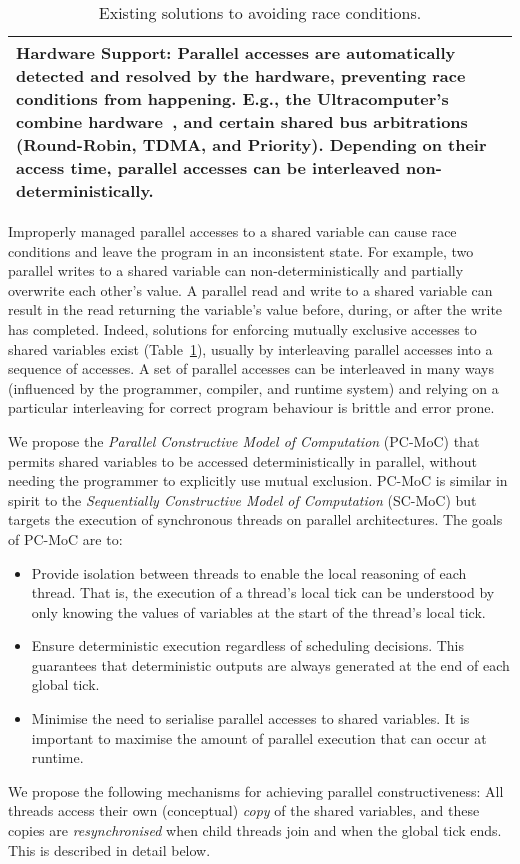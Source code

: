 \begin{table}[t]
\begin{tabular}{| p{\textwidth} |}
		\textbf{Hardware Support:}
		Parallel accesses are automatically detected and resolved by the hardware, preventing
		race conditions from happening. E.g., the Ultracomputer's combine hardware~\cite{Schwartz80}, 
		and certain shared bus arbitrations (Round-Robin, TDMA, and Priority). Depending on their 
		access time, parallel accesses can be interleaved non-deterministically.			\\
		\hline
	\end{tabular}

	\caption{Existing solutions to avoiding race conditions.}
	\label{table:forec_mutual_exclusion}
\end{table}

Improperly managed parallel accesses to a shared variable can cause
race conditions and leave the program in an inconsistent state. For 
example, two parallel writes to a shared variable can 
non-deterministically and partially overwrite each other's value. A parallel 
read and write to a shared variable can result in the read returning the variable's 
value before, during, or after the write has completed. Indeed, solutions 
for enforcing mutually exclusive accesses to shared variables exist (Table~\ref{table:forec_mutual_exclusion}), 
usually by interleaving parallel accesses into a sequence of accesses. A set of parallel accesses can be 
interleaved in many ways (influenced by the programmer, compiler, and runtime
system) and relying on a particular interleaving for correct program behaviour 
is brittle and error prone.

We propose the \emph{Parallel Constructive Model of Computation} (PC-MoC) that 
permits shared variables to be accessed deterministically in parallel, without 
needing the programmer to explicitly use mutual exclusion. PC-MoC is similar in spirit 
to the \emph{Sequentially Constructive Model of Computation} (SC-MoC) but targets the 
execution of synchronous threads on parallel architectures. The goals of PC-MoC are to: 
\begin{itemize}
	\item Provide isolation between threads to enable the local reasoning of each thread.
		  That is, the execution of a thread's local tick can be understood by only knowing 
		  the values of variables at the start of the thread's local tick.

	\item Ensure deterministic execution regardless of scheduling decisions. This guarantees 
		  that deterministic outputs are always generated at the end of each global tick.

	\item Minimise the need to serialise parallel accesses to shared variables. It is
		  important to maximise the amount of parallel execution that can occur at runtime.
\end{itemize}
We propose the following mechanisms for achieving parallel constructiveness: All threads access 
their own (conceptual) \emph{copy} of the shared variables, and these copies are \emph{resynchronised}
when child threads join and when the global tick ends. This is described in detail below.

